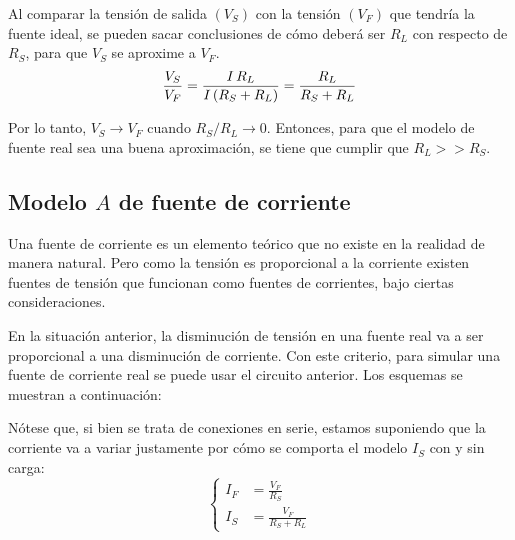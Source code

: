 \documentclass[a5paper,12pt,twoside]{book}
\begin{document}
Al comparar la tensión de salida $(V_S)$ con la tensión $(V_F)$ que tendría la fuente ideal, se pueden sacar conclusiones de cómo deberá ser $R_L$ con respecto de $R_S$, para que $V_S$ se aproxime a $V_F$.
\begin{equation*}
    \frac{V_S}{V_F} = \frac{I \, R_L}{I \left(R_S + R_L\right)} = \frac{R_L}{R_S + R_L}
\end{equation*}

Por lo tanto, $V_S \to V_F$ cuando $R_S / R_L \to 0$.
Entonces, para que el modelo de fuente real sea una buena aproximación, se tiene que cumplir que $R_L >> R_S$.

\begin{center}
    \def\svgwidth{0.6\linewidth}
    
\end{center}


\subsection{Modelo $A$ de fuente de corriente}

Una fuente de corriente es un elemento teórico que no existe en la realidad de manera natural.
Pero como la tensión es proporcional a la corriente existen fuentes de tensión que funcionan como fuentes de corrientes, bajo ciertas consideraciones.

En la situación anterior, la disminución de tensión en una fuente real va a ser proporcional a una disminución de corriente.
Con este criterio, para simular una fuente de corriente real se puede usar el circuito anterior.
Los esquemas se muestran a continuación:

\begin{multicols}{2}
    \begin{center}
        \def\svgwidth{0.9\linewidth}
        
    \end{center}
    \begin{center}
        \def\svgwidth{0.9\linewidth}
        
    \end{center}
\end{multicols}

Nótese que, si bien se trata de conexiones en serie, estamos suponiendo que la corriente va a variar justamente por cómo se comporta el modelo $I_S$ con y sin carga:
\begin{equation*}
    \left\{
    \begin{aligned}
        I_F &= \frac{V_F}{R_S}
        \\[1ex]
        I_S &= \frac{V_F}{R_S + R_L}
    \end{aligned}
    \right.
\end{equation*}
\end{document}
